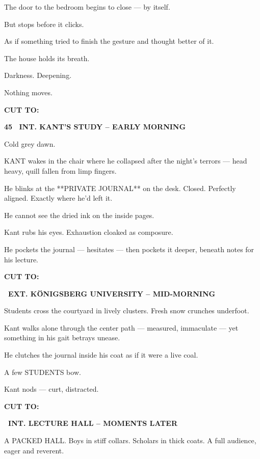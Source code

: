 \documentclass[12pt]{article}
\newcommand{\scene}[2]{%
  \vspace{1.8\baselineskip}%
  \noindent\textbf{#1 \ #2}\par\vspace{0.4\baselineskip}%
}
\newcommand{\transition}[1]{%
  \vspace{0.6\baselineskip}%
  \begin{flushright}\textbf{#1}\end{flushright}%
}
\begin{document}
The door to the bedroom begins to close
— by itself.

But stops before it clicks.

As if something tried to finish the gesture
and thought better of it.

The house holds its breath.

Darkness.
Deepening.

Nothing moves.

\transition{CUT TO:}


\scene{45}{INT. KANT'S STUDY -- EARLY MORNING}

Cold grey dawn.

KANT wakes in the chair where he collapsed after the night’s terrors —
head heavy, quill fallen from limp fingers.

He blinks at the **PRIVATE JOURNAL** on the desk.
Closed. Perfectly aligned.
Exactly where he’d left it.

He cannot see the dried ink on the inside pages.

Kant rubs his eyes.
Exhaustion cloaked as composure.

He pockets the journal —
hesitates —
then pockets it deeper, beneath notes for his lecture.

\transition{CUT TO:}


\scene{}{EXT. KÖNIGSBERG UNIVERSITY -- MID-MORNING}

Students cross the courtyard in lively clusters.
Fresh snow crunches underfoot.

Kant walks alone through the center path —
measured, immaculate —
yet something in his gait betrays unease.

He clutches the journal inside his coat
as if it were a live coal.

A few STUDENTS bow.

Kant nods — curt, distracted.

\transition{CUT TO:}


\scene{}{INT. LECTURE HALL -- MOMENTS LATER}

A PACKED HALL.
Boys in stiff collars. Scholars in thick coats.
A full audience, eager and reverent.
\end{document}
